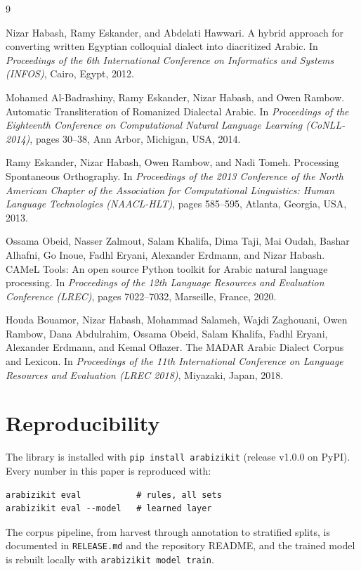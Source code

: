\documentclass[11pt]{article}
\newcommand{\az}[1]{\texttt{#1}}
\begin{document}
\begin{thebibliography}{9}

Nizar Habash, Ramy Eskander, and Abdelati Hawwari.
\newblock A hybrid approach for converting written Egyptian colloquial
dialect into diacritized Arabic.
\newblock In \emph{Proceedings of the 6th International Conference on
Informatics and Systems (INFOS)}, Cairo, Egypt, 2012.

Mohamed Al-Badrashiny, Ramy Eskander, Nizar Habash, and Owen Rambow.
\newblock Automatic Transliteration of Romanized Dialectal Arabic.
\newblock In \emph{Proceedings of the Eighteenth Conference on
Computational Natural Language Learning (CoNLL-2014)}, pages 30--38,
Ann Arbor, Michigan, USA, 2014.

Ramy Eskander, Nizar Habash, Owen Rambow, and Nadi Tomeh.
\newblock Processing Spontaneous Orthography.
\newblock In \emph{Proceedings of the 2013 Conference of the North
American Chapter of the Association for Computational Linguistics:
Human Language Technologies (NAACL-HLT)}, pages 585--595, Atlanta,
Georgia, USA, 2013.

Ossama Obeid, Nasser Zalmout, Salam Khalifa, Dima Taji, Mai Oudah,
Bashar Alhafni, Go Inoue, Fadhl Eryani, Alexander Erdmann, and Nizar
Habash.
\newblock CAMeL Tools: An open source Python toolkit for Arabic natural
language processing.
\newblock In \emph{Proceedings of the 12th Language Resources and
Evaluation Conference (LREC)}, pages 7022--7032, Marseille, France,
2020.

Houda Bouamor, Nizar Habash, Mohammad Salameh, Wajdi Zaghouani, Owen
Rambow, Dana Abdulrahim, Ossama Obeid, Salam Khalifa, Fadhl Eryani,
Alexander Erdmann, and Kemal Oflazer.
\newblock The MADAR Arabic Dialect Corpus and Lexicon.
\newblock In \emph{Proceedings of the 11th International Conference on
Language Resources and Evaluation (LREC 2018)}, Miyazaki, Japan, 2018.

\end{thebibliography}

\appendix
\section{Reproducibility}
\label{app:repro}

The library is installed with \az{pip install arabizikit} (release v1.0.0
on PyPI). Every number in this paper is reproduced with:

\begin{verbatim}
arabizikit eval           # rules, all sets
arabizikit eval --model   # learned layer
\end{verbatim}

The corpus pipeline, from harvest through annotation to stratified
splits, is documented in \az{RELEASE.md} and the repository README, and
the trained model is rebuilt locally with \az{arabizikit model train}.
\end{document}
